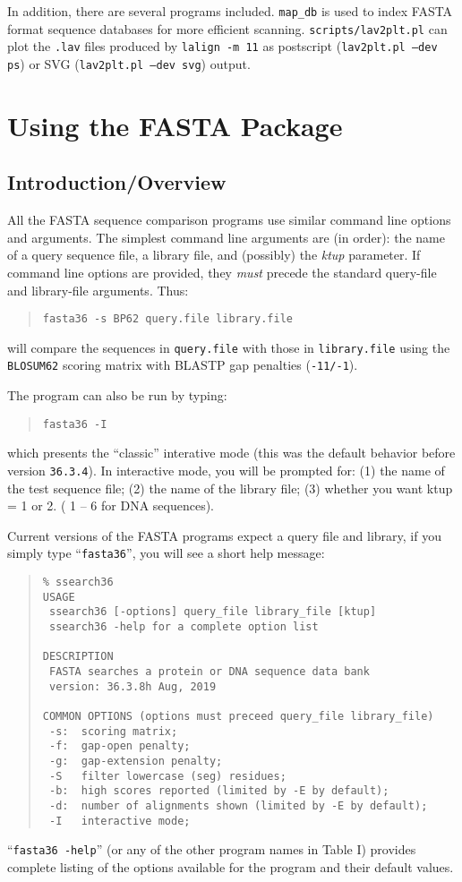 \documentclass[11pt]{article}
\begin{document}
In addition, there are several programs included. \texttt{map\_db} is
used to index FASTA format sequence databases for more efficient
scanning. \texttt{scripts/lav2plt.pl} can plot the \texttt{.lav}
files produced by \texttt{lalign -m 11} as postscript
(\texttt{lav2plt.pl --dev ps}) or SVG (\texttt{lav2plt.pl --dev svg}) output.

\section{Using the FASTA Package}
\subsection{Introduction/Overview}

All the FASTA sequence comparison programs use similar command line
options and arguments.  The simplest command line arguments are (in
order): the name of a query sequence file, a library file, and
(possibly) the \emph{ktup} parameter.  If command line options are
provided, they \emph{must} precede the standard query-file and
library-file arguments. Thus:
\begin{quote}
\texttt{fasta36 -s BP62 query.file library.file}
\end{quote}
will compare the sequences in \texttt{query.file} with those in
\texttt{library.file} using the \texttt{BLOSUM62} scoring matrix with
BLASTP gap penalties (\texttt{-11/-1}).

The program can also be run by typing:
\begin{quote}
\texttt{fasta36 -I}
\end{quote}
which presents the ``classic'' interative mode (this was
the default behavior before version \texttt{36.3.4}).
In interactive mode,
you will be prompted for: (1) the name of the test sequence file; (2)
the name of the library file; (3) whether you want ktup = 1 or 2. (
1 -- 6 for DNA sequences).

Current versions of the FASTA programs expect a query file and library, if you simply type ``\texttt{fasta36}'', you will see a short help message:
\begin{footnotesize}
\begin{quote}
\begin{verbatim}
% ssearch36
USAGE
 ssearch36 [-options] query_file library_file [ktup]
 ssearch36 -help for a complete option list

DESCRIPTION
 FASTA searches a protein or DNA sequence data bank
 version: 36.3.8h Aug, 2019

COMMON OPTIONS (options must preceed query_file library_file)
 -s:  scoring matrix;
 -f:  gap-open penalty;
 -g:  gap-extension penalty;
 -S   filter lowercase (seg) residues;
 -b:  high scores reported (limited by -E by default);
 -d:  number of alignments shown (limited by -E by default);
 -I   interactive mode;
\end{verbatim}
\end{quote}
\end{footnotesize}
``\texttt{fasta36 -help}'' (or any of the other program names in Table
I) provides complete listing of the options available for the program
and their default values.
\end{document}
